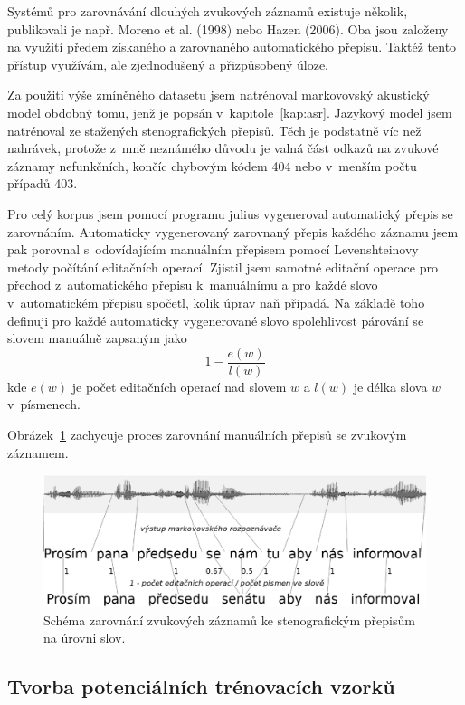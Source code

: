 Systémů pro zarovnávání dlouhých zvukových záznamů existuje několik, publikovali
je např. Moreno et al. (1998)\cite{moreno1998recursive} nebo
Hazen (2006)\cite{hazen2006automatic}. Oba jsou založeny na využití předem získaného a
zarovnaného automatického přepisu. Taktéž tento přístup využívám, ale
zjednodušený a přizpůsobený úloze.

Za použití výše zmíněného datasetu\cite{pspdata} jsem natrénoval markovovský
akustický model obdobný tomu, jenž je popsán v~kapitole~\ref{kap:asr}. Jazykový
model jsem natrénoval ze stažených stenografických přepisů. Těch je podstatně
víc než nahrávek, protože z~mně neznámého důvodu je valná část odkazů na zvukové
záznamy nefunkčních, končíc chybovým kódem 404 nebo v~menším počtu případů 403.

Pro celý korpus jsem pomocí programu julius vygeneroval automatický přepis se
zarovnáním. Automaticky vygenerovaný zarovnaný přepis každého záznamu jsem pak
porovnal s~odovídajícím manuálním přepisem pomocí Levenshteinovy metody počítání
editačních operací. Zjistil jsem samotné editační operace pro přechod
z~automatického přepisu k~manuálnímu a pro každé slovo v~automatickém přepisu
spočetl, kolik úprav naň připadá. Na základě toho definuji pro každé automaticky
vygenerované slovo spolehlivost párování se slovem manuálně zapsaným jako
\begin{equation}1 - \frac{e(w)}{l(w)}\end{equation}
kde $e(w)$ je počet editačních operací nad slovem $w$ a $l(w)$ je délka slova
$w$ v~písmenech.

Obrázek~\ref{fig:svolocz:align} zachycuje proces zarovnání manuálních přepisů se
zvukovým záznamem.

\begin{figure}[htpb]
\includegraphics[scale=0.4]{rc/svolocz-align.eps}
\caption{Schéma zarovnání zvukových záznamů ke stenografickým přepisům na úrovni
slov.}
\label{fig:svolocz:align}
\end{figure}

\subsection{Tvorba potenciálních trénovacích vzorků}

